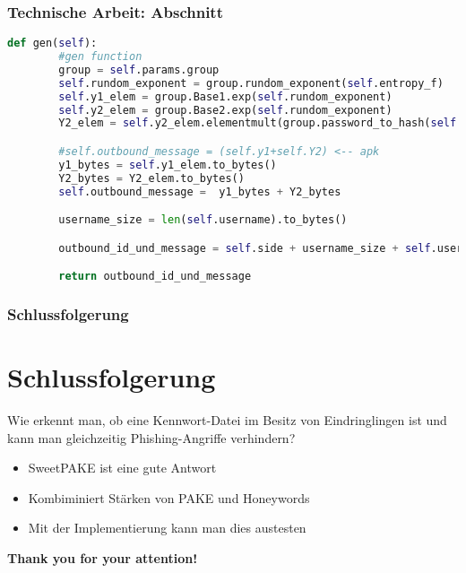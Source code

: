 \documentclass[9pt]{beamer}
\begin{document}
\begin{frame}[fragile]
\frametitle{Technische Arbeit: Abschnitt}
\begin{lstlisting}[language=Python]
def gen(self):
        #gen function
        group = self.params.group
        self.rundom_exponent = group.rundom_exponent(self.entropy_f)
        self.y1_elem = group.Base1.exp(self.rundom_exponent)
        self.y2_elem = group.Base2.exp(self.rundom_exponent)
        Y2_elem = self.y2_elem.elementmult(group.password_to_hash(self.pw))

        #self.outbound_message = (self.y1+self.Y2) <-- apk
        y1_bytes = self.y1_elem.to_bytes()
        Y2_bytes = Y2_elem.to_bytes()
        self.outbound_message =  y1_bytes + Y2_bytes

        username_size = len(self.username).to_bytes()

        outbound_id_und_message = self.side + username_size + self.username + self.outbound_message

        return outbound_id_und_message
\end{lstlisting}
\end{frame}

\begin{frame}
\frametitle{Schlussfolgerung}
\section{Schlussfolgerung}
Wie erkennt man, ob eine Kennwort-Datei im Besitz von Eindringlingen ist und
	kann man gleichzeitig Phishing-Angriffe verhindern?
\begin{itemize}
	\item SweetPAKE ist eine gute Antwort
	\item Kombiminiert Stärken von PAKE und Honeywords
	\item Mit der Implementierung kann man dies austesten
\end{itemize}
\end{frame}

\begin{frame}[fragile]
\begin{center}
    \textbf{Thank you for your attention!}\\
\end{center}
\end{frame}
\end{document}
